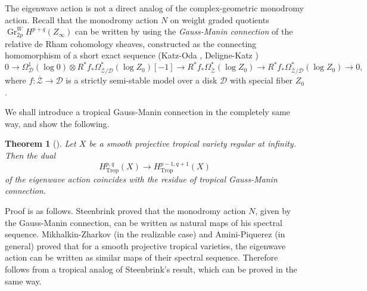 \documentclass[12pt,a4]{amsart}
\newtheorem{thm}{Theorem}[section]
\def\Gr{\mathop{\mathrm{Gr}}\nolimits}
\def\Trop{\mathop{\mathrm{trop}}\nolimits}
\def\Trop{\mathop{\mathrm{Trop}}\nolimits}
\def\Gr{\mathop{\mathrm{Gr}}\nolimits}
\numberwithin{equation}{section}
\numberwithin{figure}{section}
\begin{document}
  The eigenwave action is 
   not a direct analog of 
   the complex-geometric monodromy action.
  Recall that 
  the monodromy action $N$ 
  on weight graded quotients $\Gr_{2p}^W H^{p+q} (Z_{\infty})$
  can be written by using 
   the \emph{Gauss-Manin connection} 
   of the relative de Rham cohomology sheaves,  
   constructed as the  
   connecting homomorphism of a short exact sequence 
   (Katz-Oda \cite{KatzOdaOnthedifferentiationofDeRhamcohomologyclasseswithrespecttoparameters1968}, Deligne-Katz \cite{KatzTHEREGULARITYTHEOREMINALGEBRAICGEOMETRY1970})
   $$  0 \to \Omega_{\mathcal{D}}^1 (\log 0)  \otimes
    R^* f_* \Omega^{*}_{{\overline{\mathcal{Z}} } /\mathcal{D}} (\log Z_0 ) [-1 ]
        \to
         R^* f_*  \Omega^{*}_{\overline{\mathcal{Z}}} (\log Z_0 )  
        \to
         R^* f_*  \Omega^{*}_{{\overline{\mathcal{Z}}} /\mathcal{D}} (\log Z_0 )  \to 0 ,$$
   where $f \colon \overline{\mathcal{Z}} \to \mathcal{D}$ is a strictly semi-stable model over a disk $\mathcal{D}$ with special fiber $Z_0$.

   We shall introduce a tropical Gauss-Manin connection in the completely same way, and show the following.



  \begin{thm}[]\label{intro eigenwave prp:label}
    Let $X$ be a smooth projective tropical variety regular at infinity. 
    Then the dual
   $$H^{p,q}_{\Trop} (X ) \to H^{p-1,q+1}_{\Trop}(X)$$
    of
   the eigenwave action 
   coincides with the residue of tropical Gauss-Manin connection.
   \end{thm}

  Proof is as follows. 
  Steenbrink \cite{SteenbrinkLimitsofHodgestructures1976} proved that 
  the monodromy action $N$, 
      given by the Gauss-Manin connection, 
     can be written as natural maps of 
    his spectral sequence. 
    Mikhalkin-Zharkov \cite[Proof of Theorem 3]{MikhalkinZharkovTropicaleignewaveandintermediatejacobians2014}
    (in the realizable case) 
    and 
  Amini-Piquerez \cite[Corollary 6.21]{AminiPiquerezHodgetheoryfortropicalvarieties2020} 
    (in general)
   proved that for a smooth projective tropical varieties, 
   the eigenwave action can be written as similar maps  of their spectral sequence.
  Therefore  follows from a tropical analog of Steenbrink's result,
   which can be proved in the same way.
\end{document}
